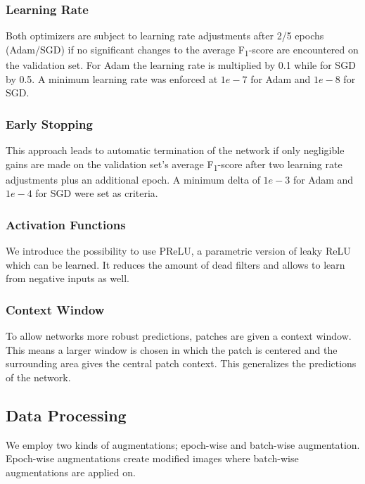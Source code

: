 \documentclass[10pt,conference,compsocconf]{IEEEtran}
\begin{document}
\subsubsection{Learning Rate}
Both optimizers are subject to learning rate adjustments after 2/5 epochs (Adam/SGD) if no significant changes to the average F\textsubscript{1}-score are encountered on the validation set. For Adam the learning rate is multiplied by 0.1 while for SGD by 0.5. A minimum learning rate was enforced at $1e-7$ for Adam and $1e-8$ for SGD.

\subsubsection{Early Stopping}
This approach leads to automatic termination of the network if only negligible gains are made on the validation set's average F\textsubscript{1}-score after two learning rate adjustments plus an additional epoch. A minimum delta of $1e-3$ for Adam and $1e-4$ for SGD were set as criteria.

\subsubsection{Activation Functions}
We introduce the possibility to use PReLU\cite{DBLP:journals/corr/HeZR015}, a parametric version of leaky ReLU which can be learned. It reduces the amount of dead filters and allows to learn from negative inputs as well.

\subsubsection{Context Window}
To allow networks more robust predictions, patches are given a context window. This means a larger window is chosen in which the patch is centered and the surrounding area gives the central patch context. This generalizes the predictions of the network.

\subsection{Data Processing}
\label{subsec:data-processing}
We employ two kinds of augmentations; epoch-wise and batch-wise augmentation. Epoch-wise augmentations create modified images where batch-wise augmentations are applied on.
\end{document}

